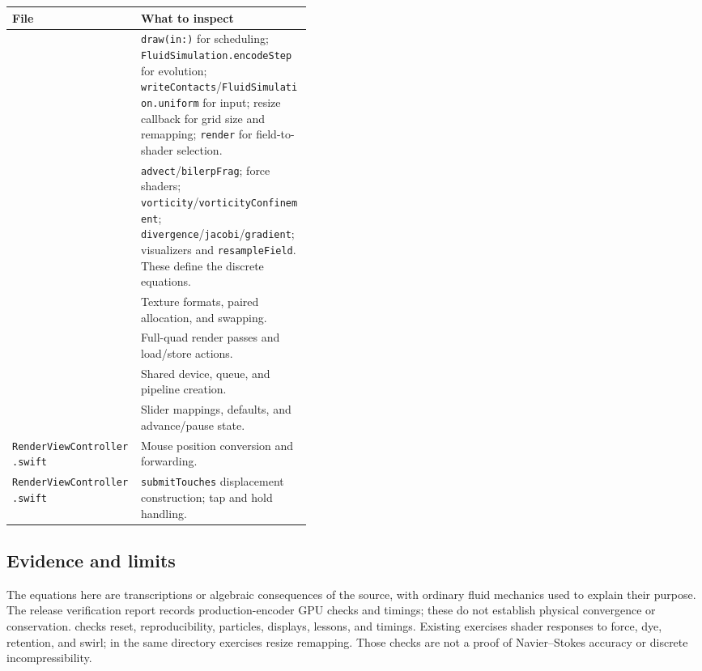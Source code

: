\documentclass[11pt,a4paper]{article}
\newcommand{\code}[1]{\texttt{#1}}
\begin{document}
{\small
\begin{tabularx}{\linewidth}{@{}>{\raggedright\arraybackslash}p{0.43\linewidth}Y@{}}
\toprule
File & What to inspect \\
\midrule
{} & \code{draw(in:)} for scheduling; \code{FluidSimulation.encodeStep} for evolution;
\code{writeContacts}/\code{FluidSimulation.uniform} for input; resize callback for grid size
and remapping; \code{render} for field-to-shader selection. \\
 & \code{advect}/\code{bilerpFrag}; force shaders;
\code{vorticity}/\code{vorticityConfinement}; \code{divergence}/\code{jacobi}/\code{gradient};
visualizers and \code{resampleField}. These define the discrete equations. \\
 & Texture formats, paired allocation, and swapping. \\
 & Full-quad render passes and load/store actions. \\
 & Shared device, queue, and pipeline creation. \\
 & Slider mappings, defaults, and advance/pause state. \\
\newline\code{RenderViewController.swift} & Mouse position conversion and forwarding. \\
\newline\code{RenderViewController.swift} & \code{submitTouches} displacement construction;
tap and hold handling. \\
\bottomrule
\end{tabularx}\par
}

\subsection*{Evidence and limits}
The equations here are transcriptions or algebraic consequences of the source,
with ordinary fluid mechanics used to explain their purpose. The release verification report records production-encoder GPU checks and timings; these do not establish physical convergence or conservation.
 checks reset, reproducibility, particles, displays, lessons, and timings. Existing  exercises shader
responses to force, dye, retention, and swirl; 
in the same directory exercises resize remapping. Those checks are not a proof
of Navier--Stokes accuracy or discrete incompressibility.
\end{document}
